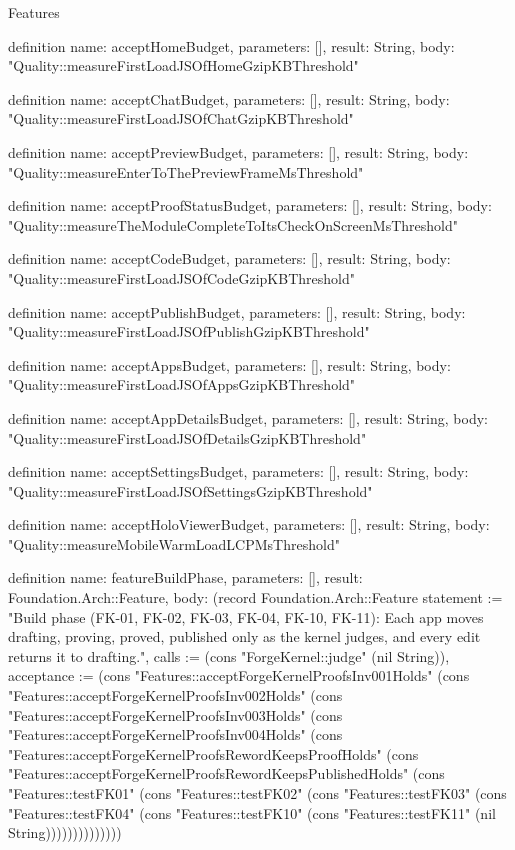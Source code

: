 \begin{lexlean}{Features}
\begin{semanticmodule}
definition{
  name: acceptHomeBudget,
  parameters: [],
  result: String,
  body: "Quality::measureFirstLoadJSOfHomeGzipKBThreshold"
}

definition{
  name: acceptChatBudget,
  parameters: [],
  result: String,
  body: "Quality::measureFirstLoadJSOfChatGzipKBThreshold"
}

definition{
  name: acceptPreviewBudget,
  parameters: [],
  result: String,
  body: "Quality::measureEnterToThePreviewFrameMsThreshold"
}

definition{
  name: acceptProofStatusBudget,
  parameters: [],
  result: String,
  body: "Quality::measureTheModuleCompleteToItsCheckOnScreenMsThreshold"
}

definition{
  name: acceptCodeBudget,
  parameters: [],
  result: String,
  body: "Quality::measureFirstLoadJSOfCodeGzipKBThreshold"
}

definition{
  name: acceptPublishBudget,
  parameters: [],
  result: String,
  body: "Quality::measureFirstLoadJSOfPublishGzipKBThreshold"
}

definition{
  name: acceptAppsBudget,
  parameters: [],
  result: String,
  body: "Quality::measureFirstLoadJSOfAppsGzipKBThreshold"
}

definition{
  name: acceptAppDetailsBudget,
  parameters: [],
  result: String,
  body: "Quality::measureFirstLoadJSOfDetailsGzipKBThreshold"
}

definition{
  name: acceptSettingsBudget,
  parameters: [],
  result: String,
  body: "Quality::measureFirstLoadJSOfSettingsGzipKBThreshold"
}

definition{
  name: acceptHoloViewerBudget,
  parameters: [],
  result: String,
  body: "Quality::measureMobileWarmLoadLCPMsThreshold"
}

definition{
  name: featureBuildPhase,
  parameters: [],
  result: Foundation.Arch::Feature,
  body: (record Foundation.Arch::Feature {statement := "Build phase (FK-01, FK-02, FK-03, FK-04, FK-10, FK-11): Each app moves drafting, proving, proved, published only as the kernel judges, and every edit returns it to drafting.", calls := (cons "ForgeKernel::judge" (nil String)), acceptance := (cons "Features::acceptForgeKernelProofsInv001Holds" (cons "Features::acceptForgeKernelProofsInv002Holds" (cons "Features::acceptForgeKernelProofsInv003Holds" (cons "Features::acceptForgeKernelProofsInv004Holds" (cons "Features::acceptForgeKernelProofsRewordKeepsProofHolds" (cons "Features::acceptForgeKernelProofsRewordKeepsPublishedHolds" (cons "Features::testFK01" (cons "Features::testFK02" (cons "Features::testFK03" (cons "Features::testFK04" (cons "Features::testFK10" (cons "Features::testFK11" (nil String)))))))))))))})
}


\end{semanticmodule}
\end{lexlean}
